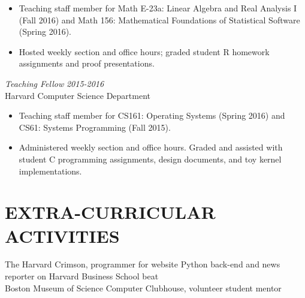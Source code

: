 \documentclass{res}
\begin{document}
\begin{resume}
    \begin{itemize} \itemsep -2.5pt
        \item Teaching staff member for Math E-23a: Linear Algebra and Real
            Analysis I (Fall 2016) and Math 156: Mathematical Foundations of
            Statistical Software (Spring 2016).

        \item Hosted weekly section and office hours; graded student R homework
            assignments and proof presentations.

    \end{itemize} 

    {\sl Teaching Fellow} \hfill {\sl 2015-2016} \\
    Harvard Computer Science Department

    \begin{itemize} \itemsep -2.5pt
        \item Teaching staff member for CS161: Operating Systems (Spring 2016)
            and CS61: Systems Programming (Fall 2015).

        \item Administered weekly section and office hours. Graded and assisted
            with student C programming assignments, design documents, and toy
            kernel implementations.

    \end{itemize} 

\section{EXTRA-CURRICULAR ACTIVITIES}      
    The Harvard Crimson, programmer for website Python back-end and news
    reporter on Harvard Business School beat\\
    Boston Museum of Science Computer Clubhouse, volunteer student mentor
 
\end{resume}
\end{document}
